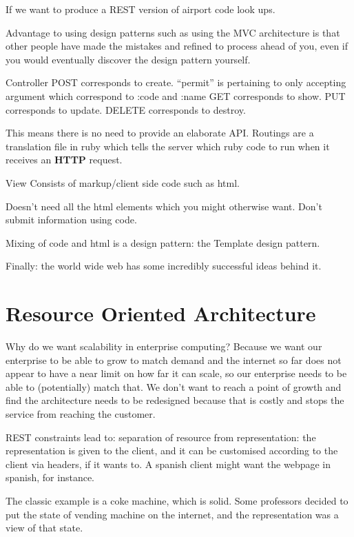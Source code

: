 \documentclass[11pt]{article}
\begin{document}
If we want to produce a REST version of airport code look ups.

Advantage to using design patterns such as using the MVC architecture is that other people have made the mistakes and refined to process ahead of you, even if you would eventually discover the design pattern yourself.

Controller
POST corresponds to create. ``permit'' is pertaining to only accepting argument which correspond to :code and :name
GET corresponds to show.
PUT corresponds to update.
DELETE corresponds to destroy.

This means there is no need to provide an elaborate API. Routings are a translation file in ruby which tells the server which ruby code to run when it receives an \textbf{HTTP} request.

View
Consists of markup/client side code such as html.

Doesn't need all the html elements which you might otherwise want.
Don't submit information using code.

Mixing of code and html is a design pattern: the Template design pattern.

Finally: the world wide web has some incredibly successful ideas behind it.


\section{Resource Oriented Architecture}

Why do we want scalability in enterprise computing? Because we want our enterprise to be able to grow to match demand and the internet so far does not appear to have a near limit on how far it can scale, so our enterprise needs to be able to (potentially) match that. We don’t want to reach a point of growth and find the architecture needs to be redesigned because that is costly and stops the service from reaching the customer.

REST constraints lead to:
separation of resource from representation: the representation is given to the client, and it can be customised according to the client via headers, if it wants to. A spanish client might want the webpage in spanish, for instance.

The classic example is a coke machine, which is solid. Some professors decided to put the state of vending machine on the internet, and the representation was a view of that state.
\end{document}
